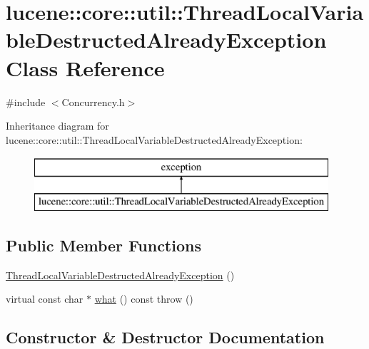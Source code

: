 \hypertarget{classlucene_1_1core_1_1util_1_1ThreadLocalVariableDestructedAlreadyException}{}\section{lucene\+:\+:core\+:\+:util\+:\+:Thread\+Local\+Variable\+Destructed\+Already\+Exception Class Reference}
\label{classlucene_1_1core_1_1util_1_1ThreadLocalVariableDestructedAlreadyException}


{\ttfamily \#include $<$Concurrency.\+h$>$}

Inheritance diagram for lucene\+:\+:core\+:\+:util\+:\+:Thread\+Local\+Variable\+Destructed\+Already\+Exception\+:\begin{figure}[H]
\begin{center}
\leavevmode
\includegraphics[height=2.000000cm]{classlucene_1_1core_1_1util_1_1ThreadLocalVariableDestructedAlreadyException}
\end{center}
\end{figure}
\subsection*{Public Member Functions}
\begin{DoxyCompactItemize}
\item 
\mbox{\hyperlink{classlucene_1_1core_1_1util_1_1ThreadLocalVariableDestructedAlreadyException_aeead4938bdae97721f6aa94bcdace7a4}{Thread\+Local\+Variable\+Destructed\+Already\+Exception}} ()
\item 
virtual const char $\ast$ \mbox{\hyperlink{classlucene_1_1core_1_1util_1_1ThreadLocalVariableDestructedAlreadyException_a519acaa7126c57d0c66b1101afa97d38}{what}} () const  throw ()
\end{DoxyCompactItemize}


\subsection{Constructor \& Destructor Documentation}
\mbox{\label{classlucene_1_1core_1_1util_1_1ThreadLocalVariableDestructedAlreadyException_aeead4938bdae97721f6aa94bcdace7a4}} 
